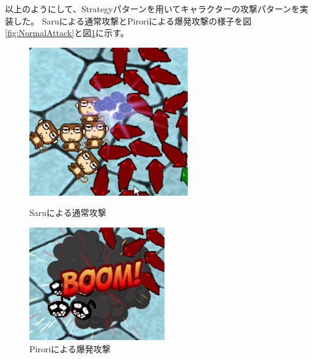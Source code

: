 \documentclass[dvipdfmx,fleqn,article]{jlreq}
\begin{document}
以上のようにして、Strategyパターンを用いてキャラクターの攻撃パターンを実装した。
Saruによる通常攻撃とPiroriによる爆発攻撃の様子を図\ref{fig:NormalAttack}と図\ref{fig:ExplosionAttack}に示す。
\begin{figure}[H]
    \centering
    \begin{minipage}{0.45\textwidth}
        \centering
        \includegraphics[width=\textwidth]{figures/NormalAttack.png}
        \caption{Saruによる通常攻撃}
        \label{fig:NormalAttack}
    \end{minipage}
    \hfill
    \begin{minipage}{0.45\textwidth}
        \centering
        \includegraphics[width=\textwidth]{figures/ExplosionAttack.png}
        \caption{Piroriによる爆発攻撃}
        \label{fig:ExplosionAttack}
    \end{minipage}
\end{figure}
\end{document}
